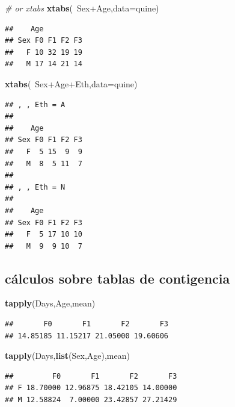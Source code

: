 \documentclass[]{article}
\newenvironment{Shaded}{\begin{snugshade}}{\end{snugshade}}
\newcommand{\KeywordTok}[1]{\textcolor[rgb]{0.13,0.29,0.53}{\textbf{{#1}}}}
\newcommand{\DataTypeTok}[1]{\textcolor[rgb]{0.13,0.29,0.53}{{#1}}}
\newcommand{\CommentTok}[1]{\textcolor[rgb]{0.56,0.35,0.01}{\textit{{#1}}}}
\newcommand{\NormalTok}[1]{{#1}}
\numberwithin{equation}{section}
\begin{document}
\begin{Shaded}
\begin{Highlighting}[]
\CommentTok{# or xtabs}
\KeywordTok{xtabs}\NormalTok{(~Sex+Age,}\DataTypeTok{data=}\NormalTok{quine)}
\end{Highlighting}
\end{Shaded}

\begin{verbatim}
##    Age
## Sex F0 F1 F2 F3
##   F 10 32 19 19
##   M 17 14 21 14
\end{verbatim}

\begin{Shaded}
\begin{Highlighting}[]
\KeywordTok{xtabs}\NormalTok{(~Sex+Age+Eth,}\DataTypeTok{data=}\NormalTok{quine)}
\end{Highlighting}
\end{Shaded}

\begin{verbatim}
## , , Eth = A
## 
##    Age
## Sex F0 F1 F2 F3
##   F  5 15  9  9
##   M  8  5 11  7
## 
## , , Eth = N
## 
##    Age
## Sex F0 F1 F2 F3
##   F  5 17 10 10
##   M  9  9 10  7
\end{verbatim}

\subsection{cálculos sobre tablas de
contigencia}\label{calculos-sobre-tablas-de-contigencia}

\begin{Shaded}
\begin{Highlighting}[]
\KeywordTok{tapply}\NormalTok{(Days,Age,mean)}
\end{Highlighting}
\end{Shaded}

\begin{verbatim}
##       F0       F1       F2       F3 
## 14.85185 11.15217 21.05000 19.60606
\end{verbatim}

\begin{Shaded}
\begin{Highlighting}[]
\KeywordTok{tapply}\NormalTok{(Days,}\KeywordTok{list}\NormalTok{(Sex,Age),mean)}
\end{Highlighting}
\end{Shaded}

\begin{verbatim}
##         F0       F1       F2       F3
## F 18.70000 12.96875 18.42105 14.00000
## M 12.58824  7.00000 23.42857 27.21429
\end{verbatim}
\end{document}
